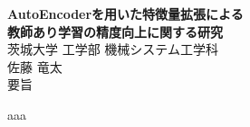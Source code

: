 \begin{center}
  \textbf{{\LARGE AutoEncoderを用いた特徴量拡張による\\教師あり学習の精度向上に関する研究\\}}
  \vspace{5mm}
  {\large 茨城大学 工学部 機械システム工学科\\
  佐藤 竜太\\}
  \vspace{5mm}
  {\large 要旨}
  \vspace{5mm}
\end{center}
aaa

\newpage
